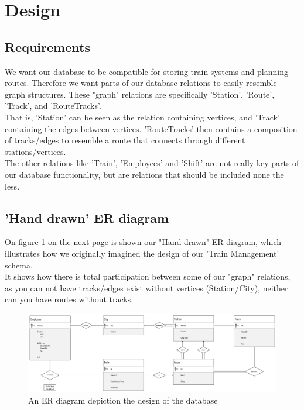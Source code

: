 \section{Design}



\subsection{Requirements} %
We want our database to be compatible for storing train systems and planning routes. Therefore we want parts of our database relations to easily resemble graph structures. These "graph" relations are specifically 'Station', 'Route', 'Track', and 'RouteTracks'.\\
That is, 'Station' can be seen as the relation containing vertices, and 'Track' containing the edges between vertices. 'RouteTracks' then contains a composition of tracks/edges to resemble a route that connects through different stations/vertices.\\[12pt]
The other relations like 'Train', 'Employees' and 'Shift' are not really key parts of our database functionality, but are relations that should be included none the less.

\subsection{'Hand drawn' ER diagram}
On figure 1 on the next page is shown our "Hand drawn" ER diagram, which illustrates how we originally imagined the design of our 'Train Management' schema.\\
It shows how there is total participation between some of our "graph" relations, as you can not have tracks/edges exist without vertices (Station/City), neither can you have routes without tracks.


\newpage
\begin{figure}[ht!]
    \centering
    \includegraphics[angle=90,origin=c,width=.4\textwidth]{img/Handwritten_ER}
    \caption{An ER diagram depiction the design of the database}
    \label{fig:ER}
\end{figure}

